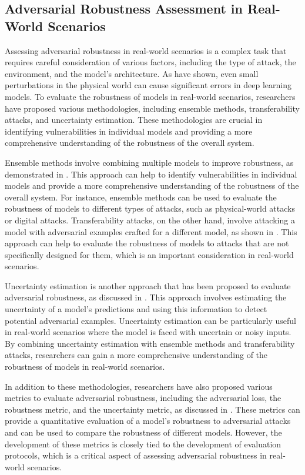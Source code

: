 \documentclass[11pt,a4paper]{article}
\begin{document}
\subsection{Adversarial Robustness Assessment in Real-World Scenarios}


Assessing adversarial robustness in real-world scenarios is a complex task that requires careful consideration of various factors, including the type of attack, the environment, and the model's architecture. As \cite{doi:10.1201/9781351251389-8} have shown, even small perturbations in the physical world can cause significant errors in deep learning models. To evaluate the robustness of models in real-world scenarios, researchers have proposed various methodologies, including ensemble methods, transferability attacks, and uncertainty estimation. These methodologies are crucial in identifying vulnerabilities in individual models and providing a more comprehensive understanding of the robustness of the overall system.

Ensemble methods involve combining multiple models to improve robustness, as demonstrated in \cite{arxiv:2110.03825}. This approach can help to identify vulnerabilities in individual models and provide a more comprehensive understanding of the robustness of the overall system. For instance, ensemble methods can be used to evaluate the robustness of models to different types of attacks, such as physical-world attacks or digital attacks. Transferability attacks, on the other hand, involve attacking a model with adversarial examples crafted for a different model, as shown in \cite{doi:10.1109/iros51168.2021.9636638}. This approach can help to evaluate the robustness of models to attacks that are not specifically designed for them, which is an important consideration in real-world scenarios.

Uncertainty estimation is another approach that has been proposed to evaluate adversarial robustness, as discussed in \cite{doi:10.1109/access.2020.2993304}. This approach involves estimating the uncertainty of a model's predictions and using this information to detect potential adversarial examples. Uncertainty estimation can be particularly useful in real-world scenarios where the model is faced with uncertain or noisy inputs. By combining uncertainty estimation with ensemble methods and transferability attacks, researchers can gain a more comprehensive understanding of the robustness of models in real-world scenarios.

In addition to these methodologies, researchers have also proposed various metrics to evaluate adversarial robustness, including the adversarial loss, the robustness metric, and the uncertainty metric, as discussed in \cite{doi:10.1109/wacv51458.2022.00144}. These metrics can provide a quantitative evaluation of a model's robustness to adversarial attacks and can be used to compare the robustness of different models. However, the development of these metrics is closely tied to the development of evaluation protocols, which is a critical aspect of assessing adversarial robustness in real-world scenarios.
\end{document}
